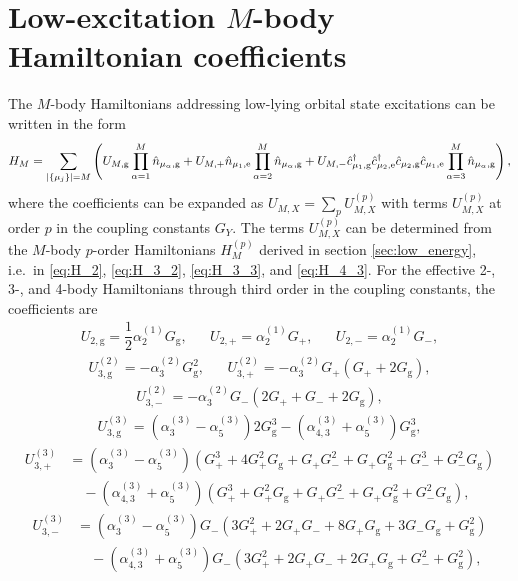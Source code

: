 \documentclass[preprint,showkeys,nofootinbib]{revtex4-1}
\newcommand{\f}{\dfrac} %
\newcommand{\p}[1]{\left(#1\right)} %
\renewcommand{\set}[1]{\left\{#1\right\}} %
\newcommand{\g}{\text{g}}
\newcommand{\e}{\text{e}}
\renewcommand{\c}{\hat{c}}
\newcommand{\n}{\hat{n}}
\newcommand{\1}{\mathds{1}}
\begin{document}
\section{Low-excitation $M$-body Hamiltonian coefficients}
\label{sec:U_X}

The $M$-body Hamiltonians addressing low-lying orbital state
excitations can be written in the form
\begin{align}
  H_M = \sum_{\abs{\set{\mu_j}}=M}
  \p{U_{M,\g} \prod_{\alpha=1}^M \n_{\mu_\alpha,\g}
    + U_{M,+} \n_{\mu_1,\e} \prod_{\alpha=2}^M \n_{\mu_\alpha,\g}
    + U_{M,-} \c_{\mu_1,\g}^\dag \c_{\mu_2,\e}^\dag
    \c_{\mu_2,\g} \c_{\mu_1,\e} \prod_{\alpha=3}^M \n_{\mu_\alpha,\g}},
\end{align}
where the coefficients can be expanded as
$U_{M,X} = \sum_p U_{M,X}^{(p)}$ with terms $U_{M,X}^{(p)}$ at order
$p$ in the coupling constants $G_Y$.  The terms $U_{M,X}^{(p)}$ can be
determined from the $M$-body $p$-order Hamiltonians $H_M^{(p)}$
derived in section \ref{sec:low_energy}, i.e.~in \eqref{eq:H_2},
\eqref{eq:H_3_2}, \eqref{eq:H_3_3}, and \eqref{eq:H_4_3}.  For the
effective 2-, 3-, and 4-body Hamiltonians through third order in the
coupling constants, the coefficients are
\begin{align}
  U_{2,\g} = \f12 \alpha_2^{(1)} G_\g,
  &&
  U_{2,+} = \alpha_2^{(1)} G_+,
  &&
  U_{2,-} = \alpha_2^{(1)} G_-,
\end{align}
\begin{align}
  U_{3,\g}^{(2)} = - \alpha_3^{(2)} G_\g^2,
  &&
  U_{3,+}^{(2)} = - \alpha_3^{(2)} G_+ \p{G_+ + 2 G_\g},
\end{align}
\begin{align}
  U_{3,-}^{(2)} = - \alpha_3^{(2)} G_- \p{2 G_+ + G_- + 2 G_\g},
\end{align}
\begin{align}
  U_{3,\g}^{(3)}
  = \p{\alpha_3^{(3)} - \alpha_5^{(3)}} 2 G_\g^3
  - \p{\alpha_{4,3}^{(3)} + \alpha_5^{(3)}} G_\g^3,
\end{align}
\begin{align}
  U_{3,+}^{(3)}
  &= \p{\alpha_3^{(3)} - \alpha_5^{(3)}} \p{G_+^3 + 4 G_+^2 G_\g
    + G_+ G_-^2 + G_+ G_\g^2 + G_-^3 + G_-^2 G_\g} \nonumber \\
  &\quad - \p{\alpha_{4,3}^{(3)} + \alpha_5^{(3)}}
  \p{G_+^3 + G_+^2 G_\g + G_+ G_-^2 + G_+ G_\g^2 + G_-^2 G_\g},
\end{align}
\begin{align}
  U_{3,-}^{(3)}
  &= \p{\alpha_3^{(3)} - \alpha_5^{(3)}} G_- \p{3 G_+^2
    + 2 G_+ G_- + 8 G_+ G_\g + 3 G_- G_\g + G_\g^2} \nonumber \\
  &\quad - \p{\alpha_{4,3}^{(3)} + \alpha_5^{(3)}}
  G_- \p{3 G_+^2 + 2 G_+ G_- + 2 G_+ G_\g + G_-^2 + G_\g^2},
\end{align}
\end{document}
